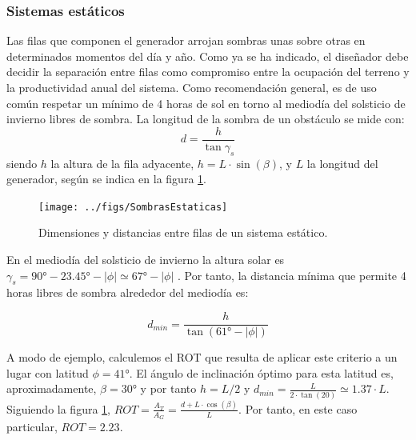 \subsubsection{Sistemas estáticos}

Las filas que componen el generador arrojan sombras unas sobre otras
en determinados momentos del día y año. Como ya se ha indicado, el
diseñador debe decidir la separación entre filas como compromiso entre
la ocupación del terreno y la productividad anual del sistema. Como
recomendación general, es de uso común respetar un mínimo de 4 horas
de sol en torno al mediodía del solsticio de invierno libres de sombra.
La longitud de la sombra de un obstáculo se mide con:
\begin{equation}
d=\frac{h}{\tan\gamma_{s}}
\end{equation}
siendo $h$ la altura de la fila adyacente, $h=L \cdot \sin(\beta)$, y
$L$ la longitud del generador, según se indica en la figura \ref{fig:Sombras-entre-filas}.

%
\begin{figure}
\begin{centering}
\texttt{[image: ../figs/SombrasEstaticas]}
\end{centering}

\caption{Dimensiones y distancias entre filas de un sistema estático.\label{fig:Sombras-entre-filas}}

\end{figure}


En el mediodía del solsticio de invierno la altura solar es
$\gamma_{s}=\ang{90} - \ang{23.45}-|\phi|\simeq \ang{67}-|\phi|$
.
Por tanto, la distancia mínima que permite 4 horas libres de sombra
alrededor del mediodía es:

\begin{equation}
d_{min}=\frac{h}{\tan(\ang{61}-|\phi|)}
\end{equation}

A modo de ejemplo, calculemos el ROT que resulta de aplicar este
criterio a un lugar con latitud $\phi=\ang{41}$. El ángulo de inclinación
óptimo para esta latitud es, aproximadamente, $\beta=\ang{30}$ y por
tanto $h=L/2$ y $d_{min}=\frac{L}{2 \cdot \tan(20)} \simeq 1.37 \cdot
L$. Siguiendo la figura \ref{fig:Sombras-entre-filas},
$ROT=\frac{A_T}{A_G}=\frac{d+L \cdot \cos(\beta)}{L}$. Por tanto, en
este caso particular, $ROT=2.23$.


